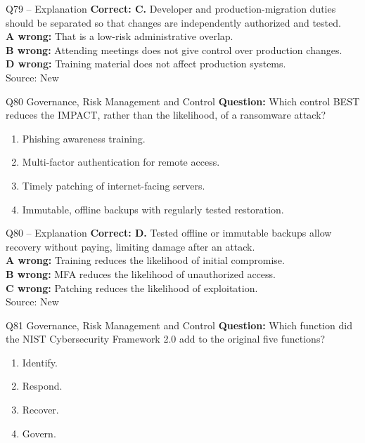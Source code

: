 \documentclass[aspectratio=169,10pt]{beamer}
\begin{document}
\begin{frame}[t]{Q79 -- Explanation}
	\footnotesize
	\textbf{Correct: C.} Developer and production-migration duties should be separated so that changes are independently authorized and tested. \\[5pt]
\textbf{A wrong:} That is a low-risk administrative overlap. \\[3pt]
\textbf{B wrong:} Attending meetings does not give control over production changes. \\[3pt]
\textbf{D wrong:} Training material does not affect production systems. \\[3pt]
	\vfill {\tiny Source: New}
\end{frame}

\begin{frame}[t]{Q80 \hfill {\scriptsize Governance, Risk Management and Control}}
	\small
	\textbf{Question:} Which control BEST reduces the IMPACT, rather than the likelihood, of a ransomware attack?
	\begin{enumerate}[label=\Alph*.,itemsep=1pt,topsep=3pt]
			\item Phishing awareness training.
			\item Multi-factor authentication for remote access.
			\item Timely patching of internet-facing servers.
			\item Immutable, offline backups with regularly tested restoration.
	\end{enumerate}
\end{frame}

\begin{frame}[t]{Q80 -- Explanation}
	\footnotesize
	\textbf{Correct: D.} Tested offline or immutable backups allow recovery without paying, limiting damage after an attack. \\[5pt]
\textbf{A wrong:} Training reduces the likelihood of initial compromise. \\[3pt]
\textbf{B wrong:} MFA reduces the likelihood of unauthorized access. \\[3pt]
\textbf{C wrong:} Patching reduces the likelihood of exploitation. \\[3pt]
	\vfill {\tiny Source: New}
\end{frame}

\begin{frame}[t]{Q81 \hfill {\scriptsize Governance, Risk Management and Control}}
	\small
	\textbf{Question:} Which function did the NIST Cybersecurity Framework 2.0 add to the original five functions?
	\begin{enumerate}[label=\Alph*.,itemsep=1pt,topsep=3pt]
			\item Identify.
			\item Respond.
			\item Recover.
			\item Govern.
	\end{enumerate}
\end{frame}
\end{document}
